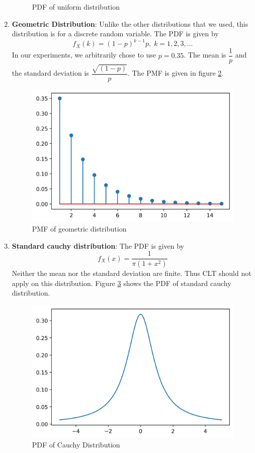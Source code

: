 \documentclass{article}
\begin{document}
\begin{enumerate}
\begin{figure}[H]
        \caption{PDF of uniform distribution}
        \label{uni_pdf}
    \end{figure}
    \item \textbf{Geometric Distribution}: Unlike the other distributions that we used, this distribution is for a discrete random variable. The PDF is given by
    $$f_X(k) = (1-p)^{k-1}p,\; k=1,2,3,...$$
    In our experiments, we arbitrarily chose to use $p=0.35$. The mean is $\dfrac{1}{p}$ and the standard deviation is $\dfrac{\sqrt{(1-p)}}{p}$. The PMF is given in figure \ref{geom_pmf}. 
    \begin{figure}[H]
        \centering
        \includegraphics[scale=0.5]{images/geometric.png}
        \caption{PMF of geometric distribution}
        \label{geom_pmf}
    \end{figure}
    \item \textbf{Standard cauchy distribution}: The PDF is given by $$f_X(x) = \dfrac{1}{\pi (1+x^2)}$$ Neither the mean nor the standard deviation are finite. Thus CLT should not apply on this distribution. Figure \ref{cauchy_pdf} shows the PDF of standard cauchy distribution.
    \begin{figure}[H]
        \centering
        \includegraphics[scale=0.4]{images/cauchy.png}
        \caption{PDF of Cauchy Distribution}
        \label{cauchy_pdf}
    \end{figure}
\end{enumerate}
\end{document}
